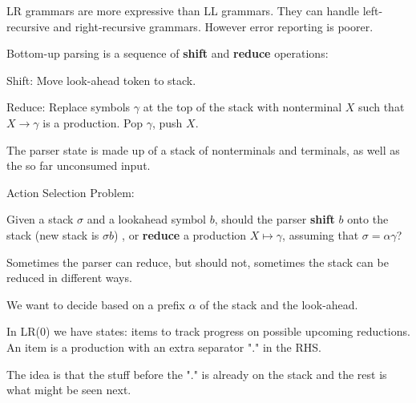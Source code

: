 LR grammars are more expressive than LL grammars. They can handle left-recursive and right-recursive grammars. However error reporting is poorer. \medskip

Bottom-up parsing is a sequence of \textbf{shift} and \textbf{reduce} operations:
\begin{compactitem}[$\quad\bullet$]
	\item Shift: Move look-ahead token to stack.

	\item Reduce: Replace symbols $\gamma$ at the top of the stack with nonterminal $X$ such that $X \to \gamma$ is a production. Pop $\gamma$, push $X$.
\end{compactitem}

The parser state is made up of a stack of nonterminals and terminals, as well as the so far unconsumed input.\medskip

Action Selection Problem:
\begin{compactitem}[$\quad\bullet$]
	\item Given a stack $\sigma$ and a lookahead symbol $b$, should the parser \textbf{shift} $b$ onto the stack (new stack is $\sigma b$) , or \textbf{reduce} a production $X \mapsto \gamma$, assuming that $\sigma = \alpha \gamma$?

	\item Sometimes the parser can reduce, but should not, sometimes the stack can be reduced in different ways.
\end{compactitem}

We want to decide based on a prefix $\alpha$ of the stack and the look-ahead. \medskip

In LR(0) we have states: items to track progress on possible upcoming reductions. An item is a production with an extra separator "." in the RHS. \medskip

The idea is that the stuff before the "." is already on the stack and the rest is what might be seen next. \medskip

